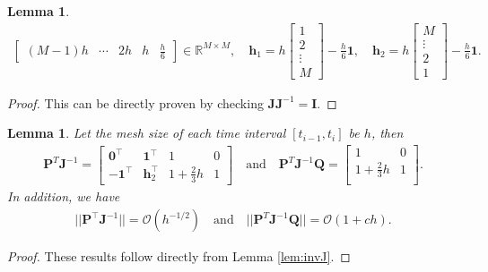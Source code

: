 \documentclass[12pt]{article}
\newtheorem{lemma}[theorem]{Lemma}
\begin{document}
\begin{lemma}
\begin{align*}
\begin{bmatrix}
		(M-1)h & \cdots & 2h & h & \frac{h}{6} 
	\end{bmatrix} \in \mathbb{R}^{M \times M},
	\quad 
	\mathbf{h}_1 = h
	\begin{bmatrix}
	1 \\
	2 \\
	\vdots\\
	M
	\end{bmatrix} - 
	\frac{h}{6} \mathbf{1}, 
	\quad 
	\mathbf{h}_2 = 
h
\begin{bmatrix}
	M \\
	\vdots \\
	2\\
	1
\end{bmatrix} - 
\frac{h}{6} \mathbf{1}. 
 \end{align*}
\end{lemma}
\begin{proof}
	This can be directly proven by checking $\mathbf{J} \mathbf{J}^{-1} = \mathbf{I}$.
\end{proof}

\begin{lemma}
Let the mesh size of each time interval $[t_{i-1}, t_i]$ be $h$, then
\begin{align*}
	\mathbf{P}^T \mathbf{J}^{-1} =  
	\begin{bmatrix}
		\mathbf{0}^{\intercal} & \mathbf{1}^{\intercal} & 1 &  0 \\
		-\mathbf{1}^\intercal & \mathbf{h}_2^{\intercal} & 1 + \frac{2}{3}h & 1
	\end{bmatrix}
	 \quad \text{and} \quad  
	\mathbf{P}^T \mathbf{J}^{-1} \mathbf{Q} = 
	\begin{bmatrix}
		1 & 0  \\
		1+\frac{2}{3}h & 1 \\
	\end{bmatrix}.
\end{align*}
In addition, we have
\begin{align*}
	|| \mathbf{P}^{\intercal} \mathbf{J}^{-1} || =  \mathcal{O}(h^{-1/2}) \quad \text{and} \quad || \mathbf{P}^T \mathbf{J}^{-1} \mathbf{Q} || = \mathcal{O}(1 + ch).
\end{align*}
\end{lemma}
\begin{proof}
These results follow directly from Lemma \ref{lem:invJ}.
\end{proof}
\end{document}
